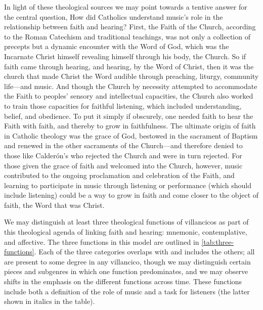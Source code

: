 In light of these theological sources we may point towards a tentive answer for the central question, How did Catholics understand music's role in the relationship between faith and hearing?
First, the Faith of the Church, according to the Roman Catechism and traditional teachings, was not only a collection of precepts but a dynamic encounter with the Word of God, which was the Incarnate Christ himself revealing himself through his body, the Church.
So if faith came through hearing, and hearing, by the Word of Christ, then it was the church that made Christ the Word audible through preaching, liturgy, community life---and music.
And though the Church by necessity attempted to accommodate the Faith to peoples' sensory and intellectual capacities, the Church also worked to train those capacities for faithful listening, which included understanding, belief, and obedience.
To put it simply if obscurely, one needed faith to hear the Faith with faith, and thereby to grow in faithfulness.
The ultimate origin of faith in Catholic theology was the grace of God, bestowed in the sacrament of Baptism and renewed in the other sacraments of the Church---and therefore denied to those like Calderón's  who rejected the Church and were in turn rejected.
For those given the grace of faith and welcomed into the Church, however, music contributed to the ongoing proclamation and celebration of the Faith, and learning to participate in music through listening or performance (which should include listening) could be a way to grow in faith and come closer to the object of faith, the Word that was Christ.

We may distinguish at least three theological functions of villancicos as part of this theological agenda of linking faith and hearing: mnemonic, contemplative, and affective. 
The three functions in this model are outlined in \cref{tab:three-functions}.
Each of the three categories overlaps with and includes the others; all are present to some degree in any villancico, though we may distinguish certain pieces and subgenres in which one function predominates, and we may observe shifts in the emphasis on the different functions across time. 
These functions include both a definition of the role of music and a task for listeners (the latter shown in italics in the table).

%	
%
